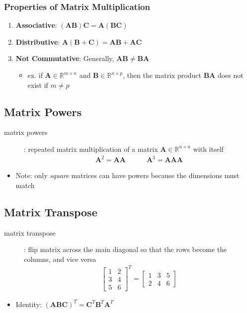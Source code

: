 \documentclass[letterpaper,12pt]{article}
\newcommand{\matr}[1]{\mathbf{#1}}
\begin{document}
\subsubsection{Properties of Matrix Multiplication}
\begin{enumerate}
 \item \textbf{Associative}:   $(\matr{A}\matr{B})\matr{C} = \matr{A}(\matr{B}\matr{C})$
 \item \textbf{Distributive}: $\matr{A}(\matr{B} + \matr{C}) = \matr{A}\matr{B} + \matr{A}\matr{C}$
 \item \textbf{Not Commutative}: Generally, $\matr{A}\matr{B} \neq \matr{B}\matr{A}$
       \begin{itemize}
        \item ex. if $\matr{A} \in \mathbb{R}^{m \times n}$ and $\matr{B} \in \mathbb{R}^{n \times p}$, then the matrix product $\matr{B}\matr{A}$ does not exist if $m \neq p$
       \end{itemize}
\end{enumerate}

\subsection{Matrix Powers}
\begin{description}
 \item[matrix powers]: repeated matrix multiplication of a matrix $\matr{A} \in \mathbb{R}^{n \times n}$ with itself
       \begin{align}
        \matr{A}^2 = \matr{A}\matr{A} \quad\quad\quad \matr{A}^3 = \matr{A}\matr{A}\matr{A}
       \end{align}
\end{description}
\begin{itemize}
 \item Note: only \textit{square} matrices can have powers because the dimensions must match
\end{itemize}

\subsection{Matrix Transpose}
\begin{description}
 \item[matrix transpose]: flip matrix across the main diagonal so that the rows become the columns, and vice versa
       \begin{align}
        \begin{bmatrix}
         1 & 2 \\
         3 & 4 \\
         5 & 6
        \end{bmatrix}^T
        =
        \begin{bmatrix}
         1 & 3 & 5 \\
         2 & 4 & 6
        \end{bmatrix}
       \end{align}
\end{description}
\begin{itemize}
 \item Identity: $(\matr{A}\matr{B}\matr{C})^T = \matr{C}^T\matr{B}^T\matr{A}^T$
\end{itemize}
\end{document}
